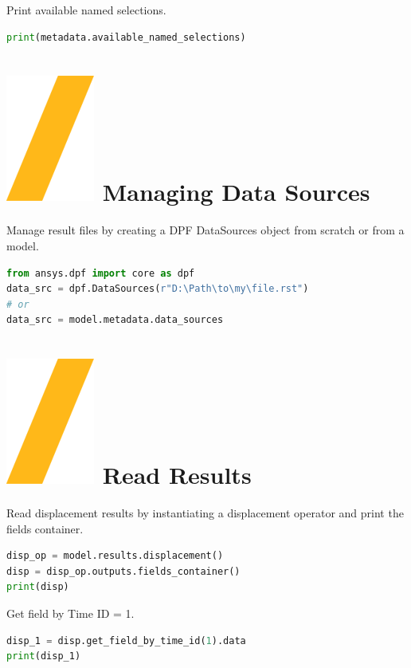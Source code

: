 \documentclass[9pt,landscape]{article}
\begin{document}
\begin{multicols}{3}
Print available named selections.
\begin{lstlisting}[language=Python]
print(metadata.available_named_selections)
\end{lstlisting}


\section{\includegraphics[height=\fontcharht\font`\S]{slash.png} Managing Data Sources}
Manage result files by creating a DPF DataSources object from scratch or from  a model.
\begin{lstlisting}[language=Python]
from ansys.dpf import core as dpf
data_src = dpf.DataSources(r"D:\Path\to\my\file.rst")
# or
data_src = model.metadata.data_sources
\end{lstlisting}


\section{\includegraphics[height=\fontcharht\font`\S]{slash.png} Read Results }
Read displacement results by instantiating a displacement operator and print the fields container.
\begin{lstlisting}[language=Python]
disp_op = model.results.displacement()
disp = disp_op.outputs.fields_container()
print(disp)
\end{lstlisting}

Get field by Time ID = 1.
\begin{lstlisting}[language=Python]
disp_1 = disp.get_field_by_time_id(1).data
print(disp_1)
\end{lstlisting}


\end{multicols}
\end{document}
